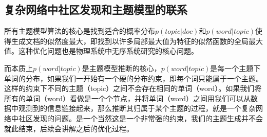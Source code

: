 \subsection{复杂网络中社区发现和主题模型的联系}
所有主题模型算法的核心是找到适合的概率分布$p(topic|doc)$和$p(word|topic)$使得生成文档的似然度最大，即找到以许多局部最大值为特征的似然函数的全局最大值。这种优化问题也是物理系统中无序系统研究的核心问题\cite{complex1,complex2,complex3}。

而本质上$p(word|topic)$是主题模型推断的核心，$p(word|topic)$是每一个主题下单词的分布，如果我们一开始有一个硬的分布约束，即每个词只能属于一个主题。这样的约束下不同的主题（topic）之间不会存在相同的单词（word）。如果我们将所有的单词（word）看做是一个个节点，并将单词（word）之间用我们可以从数据中观测到的信息链接起来，那么推断其归属于某个主题的过程，就是一个复杂网络中社区发现的问题。是一个当然这是一个非常强的约束，我们的主题生成并不会就此结束，后续会讲解之后的优化过程。
